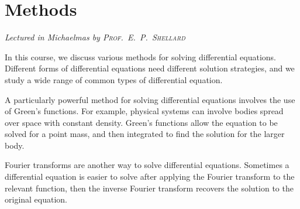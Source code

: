 \chapter[Methods \\ \textnormal{\emph{Lectured in Michaelmas \oldstylenums{2021} by \textsc{Prof.\ E.\ P.\ Shellard}}}]{Methods}
\emph{\Large Lectured in Michaelmas  by \textsc{Prof.\ E.\ P.\ Shellard}}

In this course, we discuss various methods for solving differential equations.
Different forms of differential equations need different solution strategies, and we study a wide range of common types of differential equation.

A particularly powerful method for solving differential equations involves the use of Green's functions.
For example, physical systems can involve bodies spread over space with constant density.
Green's functions allow the equation to be solved for a point mass, and then integrated to find the solution for the larger body.

Fourier transforms are another way to solve differential equations.
Sometimes a differential equation is easier to solve after applying the Fourier transform to the relevant function, then the inverse Fourier transform recovers the solution to the original equation.


